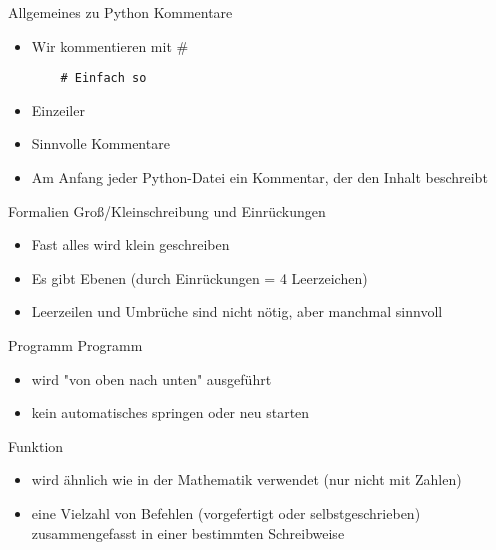 \begin{frame}[fragile]{Allgemeines zu Python}
Kommentare
\begin{itemize}
	\item Wir kommentieren mit \#
	
	\begin{lstlisting}
	# Einfach so
	\end{lstlisting}

	\item Einzeiler
	\item Sinnvolle Kommentare
	\item Am Anfang jeder Python-Datei ein Kommentar, der den Inhalt beschreibt
\end{itemize}
\end{frame}

\begin{frame}[fragile]{Formalien}
Groß/Kleinschreibung und Einrückungen 
\begin{itemize}
	\item Fast alles wird klein geschreiben
	\item Es gibt Ebenen (durch Einrückungen = 4 Leerzeichen)
	\item Leerzeilen und Umbrüche sind nicht nötig, aber manchmal sinnvoll 
	
\end{itemize}
\end{frame}

\begin{frame}{Programm}
Programm
\begin{itemize}
	\item wird "von oben nach unten" ausgeführt
	\item kein automatisches springen oder neu starten
\end{itemize}
\end{frame}

\begin{frame}{Funktion}
	\begin{itemize}
	\item wird ähnlich wie in der Mathematik verwendet (nur nicht mit Zahlen)
	\item eine Vielzahl von Befehlen (vorgefertigt oder selbstgeschrieben) zusammengefasst in einer bestimmten Schreibweise	
	\end{itemize}
\end{frame}

